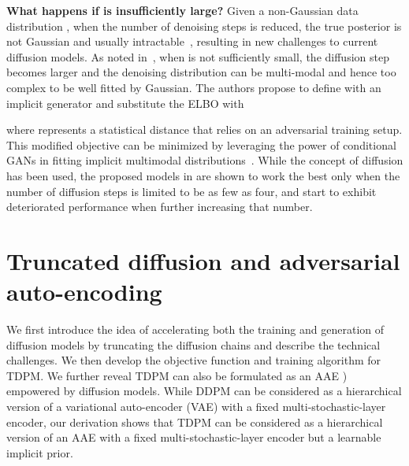 \documentclass{article} \usepackage{iclr2023_conference,times}
\newcommand{\ba}[1]{}
\newcommand{\given}{\,|\,}
\def\rvx{{\mathbf{x}}}
\theoremstyle{plain}
\theoremstyle{definition}
\theoremstyle{remark}
\begin{document}
\textbf{What happens if  is insufficiently large?}
Given a non-Gaussian data distribution ,
when the number of denoising steps is reduced, the true posterior  is not Gaussian and usually intractable~\citep{feller1949theory}, resulting in new challenges to current diffusion models.
As noted in~\citet{xiao2021tackling}, when  is not sufficiently small, the diffusion step becomes larger and the denoising distribution can be multi-modal and hence too complex to be well fitted by Gaussian.
The authors propose to define  with an implicit generator and substitute the ELBO with
\ba{\label{denoising gan}
\min _{\theta}    \textstyle \sum_{t \geq 1} \mathbb{E}_{q(t)}\left[ D_{\mathrm{adv}}\!\left(q(\rvx_{t-1} \given \rvx_{t}) \| p_{\theta}(\rvx_{t-1} \given \rvx_{t})\right)\right],
}
where  represents a statistical distance that relies on an adversarial training setup. This modified objective can be minimized by leveraging the power of conditional GANs in fitting implicit multimodal distributions~\citep{arjovsky2017wasserstein, goodfellow2014generative, nowozin2016f-gan}.
While the concept of diffusion has been used,
the proposed models in \citet{xiao2021tackling} are shown to work the best only when the number of diffusion steps is limited to be as few as four, and start to exhibit deteriorated performance when further increasing that number. 


\section{Truncated diffusion and adversarial auto-encoding }\label{sec:method}
We first introduce the idea of accelerating both the training and generation of diffusion models by truncating the diffusion chains and describe the technical challenges. We then develop the objective function and training algorithm for TDPM. We further reveal TDPM can also be formulated as an AAE \citep{makhzani2015adversarial}) empowered by diffusion models. While DDPM can be considered as a hierarchical version of a variational auto-encoder (VAE) with a fixed multi-stochastic-layer encoder, our derivation shows that TDPM can be considered as a hierarchical version of an AAE with a fixed multi-stochastic-layer encoder but a learnable implicit prior.
\end{document}
